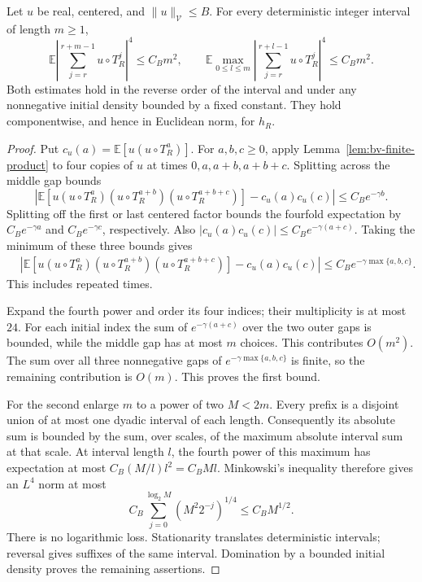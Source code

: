 \begin{proposition}
\label{prop:unsmoothed-fourth}
Let $u$ be real, centered, and $\|u\|_{\mathcal V}\le B$.
For every deterministic integer interval of length $m\ge1$,
\begin{equation}\label{eq:unsmoothed-fourth}
 \mathbb E\left|\sum_{j=r}^{r+m-1}u\circ T_R^j\right|^4\le C_Bm^2,
 \qquad
 \mathbb E\max_{0\le l\le m}
 \left|\sum_{j=r}^{r+l-1}u\circ T_R^j\right|^4\le C_Bm^2.
\end{equation}
Both estimates hold in the reverse order of the interval and under
any nonnegative initial density bounded by a fixed constant. They hold
componentwise, and hence in Euclidean norm, for $h_R$.
\end{proposition}
\begin{proof}
Put $c_u(a)=\mathbb E[u(u\circ T_R^a)]$. For $a,b,c\ge0$, apply
Lemma~\ref{lem:bv-finite-product} to four copies of $u$ at times
$0,a,a+b,a+b+c$. Splitting across the middle gap bounds
\[
 \left|\mathbb E[u(u\circ T_R^a)(u\circ T_R^{a+b})
                   (u\circ T_R^{a+b+c})]-c_u(a)c_u(c)\right|
       \le C_B e^{-\gamma b}.
\]
Splitting off the first or last centered factor bounds the fourfold
expectation by $C_Be^{-\gamma a}$ and $C_Be^{-\gamma c}$,
respectively. Also $|c_u(a)c_u(c)|\le C_Be^{-\gamma(a+c)}$.
Taking the minimum of these three bounds gives
\begin{align}\label{eq:four-product-gap}
 &\left|\mathbb E[u(u\circ T_R^a)(u\circ T_R^{a+b})
                   (u\circ T_R^{a+b+c})]-c_u(a)c_u(c)\right|
 \le C_B e^{-\gamma\max\{a,b,c\}}.
\end{align}
This includes repeated times.

Expand the fourth power and order its four indices; their multiplicity
is at most $24$. For each initial index the sum of
$e^{-\gamma(a+c)}$ over the two outer gaps is bounded, while the middle
gap has at most $m$ choices. This contributes $O(m^2)$. The sum over
all three nonnegative gaps of $e^{-\gamma\max\{a,b,c\}}$ is finite,
so the remaining contribution is $O(m)$. This proves the first bound.

For the second enlarge $m$ to a power of two $M<2m$. Every prefix is
a disjoint union of at most one dyadic interval of each length.
Consequently its absolute sum is bounded by the sum, over scales, of
the maximum absolute interval sum at that scale. At interval length
$l$, the fourth power of this maximum has expectation at most
$C_B(M/l)l^2=C_BMl$. Minkowski's inequality therefore gives an $L^4$
norm at most
\[
 C_B\sum_{j=0}^{\log_2 M}(M^2 2^{-j})^{1/4}
       \le C_B M^{1/2}.
\]
There is no logarithmic loss. Stationarity translates deterministic
intervals; reversal gives suffixes of the same interval. Domination
by a bounded initial density proves the remaining assertions.
\end{proof}

